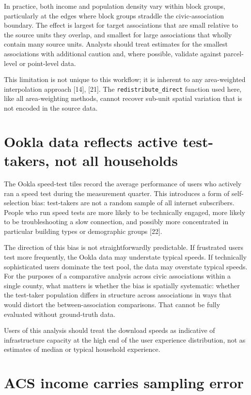 \documentclass[
  letterpaper,
  DIV=11,
  numbers=noendperiod]{scrreprt}
\begin{document}
In practice, both income and population density vary within block
groups, particularly at the edges where block groups straddle the
civic-association boundary. The effect is largest for target
associations that are small relative to the source units they overlap,
and smallest for large associations that wholly contain many source
units. Analysts should treat estimates for the smallest associations
with additional caution and, where possible, validate against
parcel-level or point-level data.

This limitation is not unique to this workflow; it is inherent to any
area-weighted interpolation approach {[}14{]}, {[}21{]}. The
\texttt{redistribute\_direct} function used here, like all
area-weighting methods, cannot recover sub-unit spatial variation that
is not encoded in the source data.

\section{Ookla data reflects active test-takers, not all
households}\label{ookla-data-reflects-active-test-takers-not-all-households}

The Ookla speed-test tiles record the average performance of users who
actively ran a speed test during the measurement quarter. This
introduces a form of self-selection bias: test-takers are not a random
sample of all internet subscribers. People who run speed tests are more
likely to be technically engaged, more likely to be troubleshooting a
slow connection, and possibly more concentrated in particular building
types or demographic groups {[}22{]}.

The direction of this bias is not straightforwardly predictable. If
frustrated users test more frequently, the Ookla data may understate
typical speeds. If technically sophisticated users dominate the test
pool, the data may overstate typical speeds. For the purposes of a
comparative analysis across civic associations within a single county,
what matters is whether the bias is spatially systematic: whether the
test-taker population differs in structure across associations in ways
that would distort the between-association comparisons. That cannot be
fully evaluated without ground-truth data.

Users of this analysis should treat the download speeds as indicative of
infrastructure capacity at the high end of the user experience
distribution, not as estimates of median or typical household
experience.

\section{ACS income carries sampling
error}\label{acs-income-carries-sampling-error}
\end{document}
